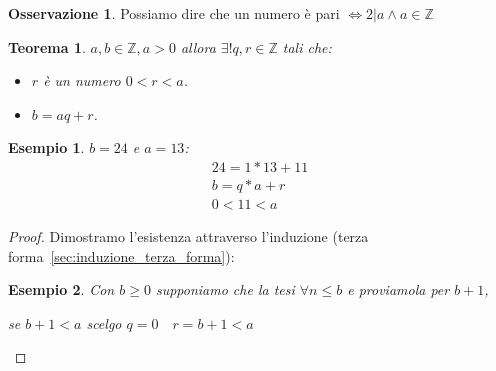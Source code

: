 \documentclass{article}
\newtheorem{exmp}{Esempio}[section]
\newtheorem{theorem}{Teorema}[section]
\theoremstyle{definition}
\newtheorem{oss}{Osservazione}[section]
\begin{document}
\begin{tcolorbox}
\begin{oss}
       Possiamo dire che un numero è pari $ \Leftrightarrow 2 | a \wedge a \in \mathbb{Z} $  
\end{oss}
\end{tcolorbox}

\begin{tcolorbox}
\begin{theorem}
       $ a,b \in \mathbb{Z}, a > 0 $ allora $ \exists! q,r \in \mathbb{Z}  $ tali che:
       \begin{itemize}
               \item $ r $ è un numero $ 0 < r < a $.
               \item $ b = aq + r $.  
       \end{itemize}
\end{theorem}
\end{tcolorbox}

\begin{exmp}
        $ b = 24 $ e $ a = 13 $:
        \begin{align*}
                24 = 1 * 13 + 11 \\
                b = q * a + r \\
                0 < 11 < a
        \end{align*}
\end{exmp}

\begin{tcolorbox}
\begin{proof}
       Dimostramo l'esistenza attraverso l'induzione (terza forma~\ref{sec:induzione_terza_forma}):\newline
       \begin{exmp}
             Con $ b \ge 0 $ supponiamo che la tesi $ \forall n \le b   $  e proviamola per $ b + 1 $, \par
             se $ b + 1 < a$ scelgo $ q = 0 \quad r = b + 1 < a $  
       \end{exmp}  
\end{proof}
\end{tcolorbox}
\end{document}
